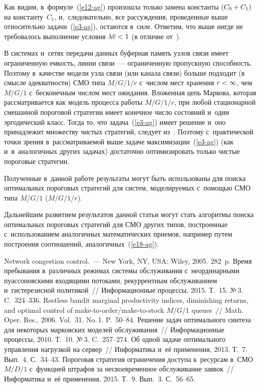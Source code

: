 \begin{multicols}{2}
  Как видим, в~формуле~(\ref{e12-ag}) произошла только замена константы 
$(C_0\hm+C_1)$ на константу~$C_1$, и,~следовательно, все рассуждения, 
проведенные выше относительно задачи~(\ref{e3-ag}), остаются в~силе. 
Отметим, что выше нигде не требовалось выполнение условия 
$\lambda\overline{v}\hm<1$ (в отличие от~\cite{7-ag}). 
  
  В системах и~сетях передачи данных буферная память узлов связи имеет 
ограниченную емкость, линии связи~--- ограниченную пропускную 
способность. Поэтому в~качестве модели узла связи (или канала связи) больше 
подходит (в смысле адекватности) СМО типа $M/G/1/r$ с~числом мест 
хранения $r\hm<\infty$, чем $M/G/1$ с~бесконечным числом мест ожидания. 
Вложенная цепь Маркова, которая рассматривается как модель процесса 
работы $M/G/1/r$, при любой стационарной смешанной пороговой стратегии 
имеет конечное чис\-ло состояний и~один эргодический класс. Тогда то, что 
задача~(\ref{e3-ag}) имеет решение и~оно принадлежит множеству чис\-тых 
стратегий, следует из~\cite{10-ag}. Поэтому с~практической точки зрения 
в~рассматриваемой выше задаче максимизации~(\ref{e3-ag}) (как 
и~в~аналогичных других задачах) достаточно оптимизировать только чистые 
пороговые стратегии. 
  
  Полученные в~данной работе результаты могут быть использованы для 
поиска оптимальных пороговых стратегий для систем, моделируемых 
с~по\-мощью СМО типа $M/G/1$ ($M/G/1/r$). 
  
  Дальнейшим развитием результатов данной статьи могут стать алгоритмы 
поиска оптимальных пороговых стратегий для СМО других типов, 
построенные с~использованием аналогичных математических приемов, 
например путем построения соотношений, аналогичных~(\ref{e18-ag}). 
     
{\small\frenchspacing
 {%
 \begin{thebibliography}{99}
 Network congestion control.~--- New York, NY, USA: Wiley, 2005. 
282~p.
 Время пребывания в~различных 
режимах системы обслуживания с~неординарными пуассоновскими 
входящими потоками, рекуррентным обслуживанием и~гистерезисной 
политикой~// Информационные процессы, 2015. Т.~15. №\,3. C.~324--336. 
 Restless bandit marginal productivity indices, diminishing 
returns, and optimal control of make-to-order/make-to-stock $M/G/1$ queues~// 
Math. Oper. Res., 2006. Vol.~31. No.\,1. P.~50--84.
 Решение задач оптимального синтеза для некоторых 
марковских моделей обслуживания~// Информационные процессы, 2010. Т.~10. 
№\,3. C.~257--274. 
 Об одной задаче оптимального управ\-ле\-ния нагрузкой на 
сервер~// Информатика и~её применения, 2013. Т.~7. Вып.~4. С.~34--43.
 Пороговая стратегия ограничения доступа к~ресурсам 
в~СМО $M/D/1$ с~функцией штрафов за несвоевременное обслуживание 
заявок~// Информатика и~её применения, 2015. Т.~9. Вып.~3. С.~56--65.


\end{thebibliography}}}
\end{multicols}
